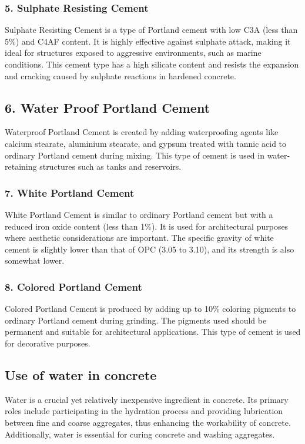 \documentclass[a4paper,11pt]{book}
\begin{document}
\subsubsection{5. Sulphate Resisting Cement}
Sulphate Resisting Cement is a type of Portland cement with low C3A (less than 5\%) and C4AF content. It is highly effective against sulphate attack, making it ideal for structures exposed to aggressive environments, such as marine conditions. This cement type has a high silicate content and resists the expansion and cracking caused by sulphate reactions in hardened concrete.

\subsection*{6. Water Proof Portland Cement}
Waterproof Portland Cement is created by adding waterproofing agents like calcium stearate, aluminium stearate, and gypsum treated with tannic acid to ordinary Portland cement during mixing. This type of cement is used in water-retaining structures such as tanks and reservoirs.

\subsubsection{7. White Portland Cement}
White Portland Cement is similar to ordinary Portland cement but with a reduced iron oxide content (less than 1\%). It is used for architectural purposes where aesthetic considerations are important. The specific gravity of white cement is slightly lower than that of OPC (3.05 to 3.10), and its strength is also somewhat lower.

\subsubsection{8. Colored Portland Cement}
Colored Portland Cement is produced by adding up to 10\% coloring pigments to ordinary Portland cement during grinding. The pigments used should be permanent and suitable for architectural applications. This type of cement is used for decorative purposes.
\subsection{Use of water in concrete}

Water is a crucial yet relatively inexpensive ingredient in concrete. Its primary roles include participating in the hydration process and providing lubrication between fine and coarse aggregates, thus enhancing the workability of concrete. Additionally, water is essential for curing concrete and washing aggregates.
\end{document}
